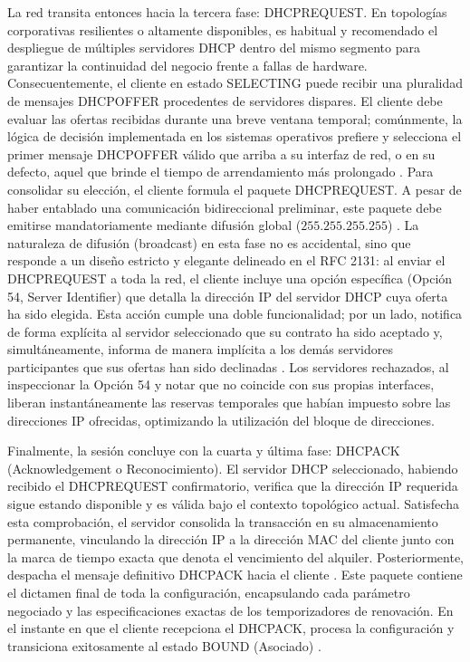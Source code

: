 \documentclass[a4paper,12pt]{article}
\begin{document}
La red transita entonces hacia la tercera fase: DHCPREQUEST. En topologías corporativas resilientes o altamente disponibles, es habitual y recomendado el despliegue de múltiples servidores DHCP dentro del mismo segmento para garantizar la continuidad del negocio frente a fallas de hardware. Consecuentemente, el cliente en estado SELECTING puede recibir una pluralidad de mensajes DHCPOFFER procedentes de servidores dispares. El cliente debe evaluar las ofertas recibidas durante una breve ventana temporal; comúnmente, la lógica de decisión implementada en los sistemas operativos prefiere y selecciona el primer mensaje DHCPOFFER válido que arriba a su interfaz de red, o en su defecto, aquel que brinde el tiempo de arrendamiento más prolongado \cite{juniper_dhcp_routing}. Para consolidar su elección, el cliente formula el paquete DHCPREQUEST. A pesar de haber entablado una comunicación bidireccional preliminar, este paquete debe emitirse mandatoriamente mediante difusión global ($255.255.255.255$) \cite{microsoft_dhcp}. La naturaleza de difusión (broadcast) en esta fase no es accidental, sino que responde a un diseño estricto y elegante delineado en el RFC 2131: al enviar el DHCPREQUEST a toda la red, el cliente incluye una opción específica (Opción 54, Server Identifier) que detalla la dirección IP del servidor DHCP cuya oferta ha sido elegida. Esta acción cumple una doble funcionalidad; por un lado, notifica de forma explícita al servidor seleccionado que su contrato ha sido aceptado y, simultáneamente, informa de manera implícita a los demás servidores participantes que sus ofertas han sido declinadas \cite{rfc2131, microsoft_dhcp}. Los servidores rechazados, al inspeccionar la Opción 54 y notar que no coincide con sus propias interfaces, liberan instantáneamente las reservas temporales que habían impuesto sobre las direcciones IP ofrecidas, optimizando la utilización del bloque de direcciones.

Finalmente, la sesión concluye con la cuarta y última fase: DHCPACK (Acknowledgement o Reconocimiento). El servidor DHCP seleccionado, habiendo recibido el DHCPREQUEST confirmatorio, verifica que la dirección IP requerida sigue estando disponible y es válida bajo el contexto topológico actual. Satisfecha esta comprobación, el servidor consolida la transacción en su almacenamiento permanente, vinculando la dirección IP a la dirección MAC del cliente junto con la marca de tiempo exacta que denota el vencimiento del alquiler. Posteriormente, despacha el mensaje definitivo DHCPACK hacia el cliente \cite{rfc2131, microsoft_dhcp}. Este paquete contiene el dictamen final de toda la configuración, encapsulando cada parámetro negociado y las especificaciones exactas de los temporizadores de renovación. En el instante en que el cliente recepciona el DHCPACK, procesa la configuración y transiciona exitosamente al estado BOUND (Asociado) \cite{serviciosgs_dhcp}. 
\end{document}

